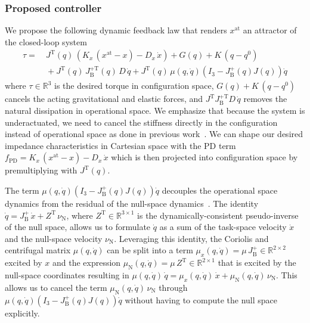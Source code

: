 \subsubsection{Proposed controller}
We propose the following dynamic feedback law that renders $x^\mathrm{at}$ an attractor of the closed-loop system %
\begin{equation}\label{eq:braincontrol:cartesian_impedance_controller}
\begin{split}
    \tau =& \: J^\mathrm{T}(q) \, \left (K_x \, (x^\mathrm{at} - x) - D_x \, \dot{x} \right ) + G(q) + K \, (q-q^0)\\
    & \: + J^\mathrm{T}(q) \, J_\mathrm{B}^{+\mathrm{T}}(q) \, D \, \dot{q} + J^\mathrm{T}(q) \, \mu(q,\dot{q}) \left ( I_3 - J_\mathrm{B}^+(q) J(q) \right )\dot{q}
\end{split}
\end{equation}
where $\tau \in \mathbb{R}^3$ is the desired torque in configuration space, $G(q) + K \, (q-q^0)$ cancels the acting gravitational and elastic forces, and $J^\mathrm{T} J_\mathrm{B}^{+\mathrm{T}} D \, \dot{q}$ removes the natural dissipation in operational space.
We emphasize that because the system is underactuated, we need to cancel the stiffness directly in the configuration instead of operational space as done in previous work~\cite{della2020model}.
We can shape our desired impedance characteristics in Cartesian space with the PD term $f_\mathrm{PD} = K_x \, (x^\mathrm{at} - x) - D_x \, \dot{x} $ which is then projected into configuration space by premultiplying with $J^\mathrm{T}(q)$.

The term $\mu(q,\dot{q}) \left ( I_3 - J_\mathrm{B}^+(q) J(q) \right )\dot{q}$ decouples the operational space dynamics from the residual of the null-space dynamics~\cite{della2020model}\cite[Ch. 4]{ott2008cartesian}.
The identity $\dot{q} = J_\mathrm{B}^+ \, \dot{x} + Z^\mathrm{T} \, \nu_\mathrm{N}$, where $Z^\mathrm{T} \in \mathbb{R}^{3 \times 1}$ is the dynamically-consistent pseudo-inverse of the null space, allows us to formulate $\dot{q}$ as a sum of the task-space velocity $\dot{x}$ and the null-space velocity $\nu_\mathrm{N}$. Leveraging this identity, the Coriolis and centrifugal matrix $\mu(q,\dot{q})$ can be split into a term $\mu_x(q,\dot{q}) = \mu \, J_\mathrm{B}^+ \in \mathbb{R}^{2 \times 2}$ excited by $x$ and the expression $\mu_\mathrm{N}(q,\dot{q}) = \mu \, Z^\mathrm{T} \in \mathbb{R}^{2 \times 1}$ that is excited by the null-space coordinates resulting in $\mu(q,\dot{q}) \, \dot{q} = \mu_x(q,\dot{q}) \, \dot{x} + \mu_\mathrm{N}(q,\dot{q}) \, \nu_\mathrm{N}$.
This allows us to cancel the term $\mu_\mathrm{N}(q,\dot{q}) \, \nu_\mathrm{N}$ through $\mu(q,\dot{q}) \left ( I_3 - J_\mathrm{B}^+(q) J(q) \right )\dot{q}$ without having to compute the null space explicitly.


